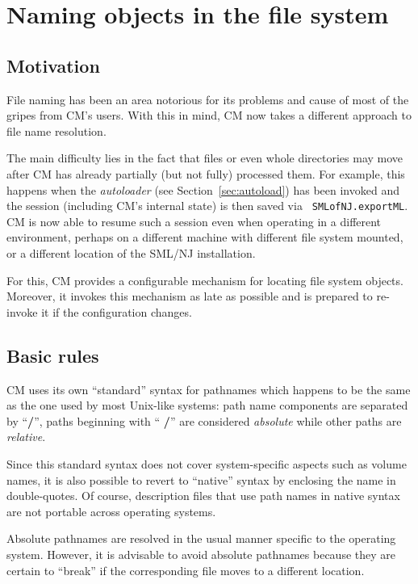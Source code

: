 \documentclass{article}
\begin{document}
\section{Naming objects in the file system}

\subsection{Motivation}

File naming has been an area notorious for its problems and cause of
most of the gripes from CM's users.  With this in mind, CM now takes a
different approach to file name resolution.

The main difficulty lies in the fact that files or even whole
directories may move after CM has already partially (but not fully)
processed them.  For example, this happens when the {\em autoloader}
(see Section~\ref{sec:autoload}) has been invoked and the session
(including CM's internal state) is then saved via {\tt
SMLofNJ.exportML}.  CM is now able to resume such a session even when
operating in a different environment, perhaps on a different machine
with different file system mounted, or a different location of the
SML/NJ installation.

For this, CM provides a configurable mechanism for locating file
system objects.  Moreover, it invokes this mechanism as late as
possible and is prepared to re-invoke it if the configuration changes.

\subsection{Basic rules}

CM uses its own ``standard'' syntax for pathnames which happens to be
the same as the one used by most Unix-like systems: path name
components are separated by ``{\bf /}'', paths beginning with ``{\bf
/}'' are considered {\em absolute} while other paths are {\em
relative}.

Since this standard syntax does not cover system-specific aspects such
as volume names, it is also possible to revert to ``native'' syntax by
enclosing the name in double-quotes.  Of course, description files
that use path names in native syntax are not portable across operating
systems.

Absolute pathnames are resolved in the usual manner specific to the
operating system.  However, it is advisable to avoid absolute
pathnames because they are certain to ``break'' if the corresponding
file moves to a different location.
\end{document}
